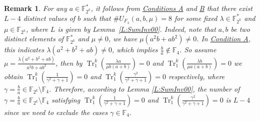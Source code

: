 \documentclass[preprint,10pt]{elsarticle}
\newcommand{\F}{\mathbb{F}}
\newcommand{\0}{\textbf{0}}
\newcommand{\1}{\textbf{1}}
\newcommand{\TRACE}{\operatorname{Tr}_1^k}
\theoremstyle{plain}
\newtheorem{remark}{Remark}
\begin{document}
    \begin{remark}
        For any $a\in\F_{2^k}^*$, it follows from \hyperref[item_a]{\textsf{Conditions A}} and \hyperref[item_b]{\textsf{B}} that there exist $L-4$ distinct values of $b$
        such that $\#U_{F_{\lambda}}(a,b,\mu)=8$ for some fixed $\lambda\in\F_{2^k}^*$ and $\mu\in\F_{2^k}$,
        where $L$ is given by Lemma~\ref{L:SumInv00}.
       Indeed, note that $a,b$ be two distinct elements of $\F_{2^k}^*$ and $\mu\ne 0$,
        we have $\mu(a^2b+ab^2)\ne 0$.
        In \hyperref[item_a]{\textsf{Condition A}}, this indicates $\lambda(a^2+b^2+ab)\ne 0$,
        which implies $\frac{b}{a}\notin\F_4$.
        So assume $\mu=\frac{\lambda(a^2+b^2+ab)}{a^2b+ab^2}$,
        then by  $\TRACE\left(\frac{\lambda a}{\mu b(a+b)}\right)=0$
        and $\TRACE\left(\frac{\lambda b}{\mu a(a+b)}\right)=0$
        we obtain $\TRACE\left(\frac{1}{\gamma^2+\gamma+1}\right)=0$ and $\TRACE\left(\frac{\gamma^2}{\gamma^2+\gamma+1}\right)=0$ respectively,
        where $\gamma=\frac{b}{a}\in\F_{2^k}\setminus\F_{4}$.
        Therefore, according to Lemma \ref{L:SumInv00},
        the number of $\gamma=\frac{b}{a}\in\F_{2^k}\setminus\F_{4}$ satisfying
        $\TRACE\left(\frac{1}{\gamma^2+\gamma+1}\right)=0$ and $\TRACE\left(\frac{\gamma^2}{\gamma^2+\gamma+1}\right)=0$
        is $L-4$ since we need to exclude the cases $\gamma\in\F_4$.
    \end{remark}
\end{document}
